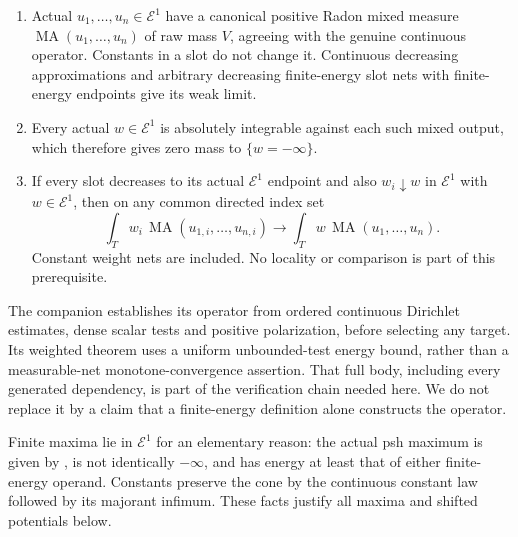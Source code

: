 \documentclass[11pt]{article}
\newcommand{\MA}{\operatorname{MA}}
\newcommand{\E}{\mathcal E}
\begin{document}
\begin{enumerate}
\item Actual $u_1,\ldots,u_n\in\E^1$ have a canonical positive
Radon mixed measure $\MA(u_1,\ldots,u_n)$ of raw mass $V$, agreeing
with the genuine continuous operator. Constants in a slot do not
change it. Continuous decreasing approximations and arbitrary
decreasing finite-energy slot nets with finite-energy endpoints give
its weak limit.
\item Every actual $w\in\E^1$ is absolutely integrable against
each such mixed output, which therefore gives zero mass to $\{w=-\infty\}$.
\item If every slot decreases to its actual $\E^1$ endpoint and
also $w_i\downarrow w$ in $\E^1$ with $w\in\E^1$, then on any
common directed index set
\begin{equation}\label{eq:prerequisite}
 \int_T w_i\,\MA(u_{1,i},\ldots,u_{n,i})
       \longrightarrow\int_T w\,\MA(u_1,\ldots,u_n).
\end{equation}
Constant weight nets are included. No locality or comparison is part
of this prerequisite.
\end{enumerate}

The companion establishes its operator from ordered continuous
Dirichlet estimates, dense scalar tests and positive polarization,
before selecting any target. Its weighted theorem uses a uniform
unbounded-test energy bound, rather than a measurable-net
monotone-convergence assertion. That full body, including every
generated dependency, is part of the verification chain needed here.
We do not replace it by a claim that a finite-energy definition alone
constructs the operator.

Finite maxima lie in $\E^1$ for an elementary reason: the actual
psh maximum is given by \cite[Corollary 7.5]{BE}, is not identically
$-\infty$, and has energy at least that of either finite-energy
operand. Constants preserve the cone by the continuous constant
law followed by its majorant infimum. These facts justify all
maxima and shifted potentials below.
\end{document}

